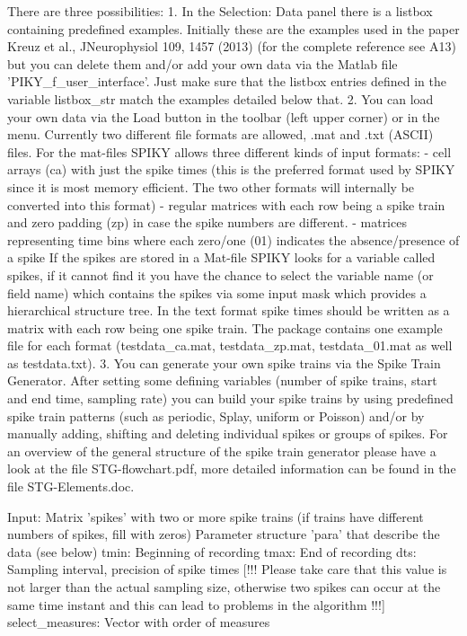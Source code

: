 \documentclass[10pt,twocolumn]{elsart5p}
\begin{document}
There are three possibilities:
1.	In the Selection: Data panel there is a listbox containing predefined examples. Initially these are the examples used in the paper Kreuz et al., JNeurophysiol 109, 1457 (2013) (for the complete reference see A13) but you can delete them and/or add your own data via the Matlab file 'PIKY\_f\_user\_interface'. Just make sure that the listbox entries defined in the variable listbox\_str match the examples detailed below that.
2.	You can load your own data via the Load button in the toolbar (left upper corner) or in the menu. Currently two different file formats are allowed, .mat and .txt (ASCII) files. For the mat-files SPIKY allows three different kinds of input formats:
- cell arrays (ca) with just the spike times (this is the preferred format used by SPIKY since it is most memory efficient. The two other formats will internally be converted into this format)
- regular matrices with each row being a spike train and zero padding (zp) in case the spike numbers are different.
- matrices representing time bins where each zero/one (01) indicates the absence/presence of a spike
If the spikes are stored in a Mat-file SPIKY looks for a variable called spikes, if it cannot find it you have the chance to select the variable name (or field name) which contains the spikes via some input mask which provides a hierarchical structure tree.
In the text format spike times should be written as a matrix with each row being one spike train. The package contains one example file for each format (testdata\_ca.mat, testdata\_zp.mat, testdata\_01.mat as well as testdata.txt). 
3.	You can generate your own spike trains via the Spike Train Generator. After setting some defining variables (number of spike trains, start and end time, sampling rate) you can build your spike trains by using predefined spike train patterns (such as periodic, Splay, uniform or Poisson) and/or by manually adding, shifting and deleting individual spikes or groups of spikes. For an overview of the general structure of the spike train generator please have a look at the file STG-flowchart.pdf, more detailed information can be found in the file STG-Elements.doc.


Input:
Matrix 'spikes' with two or more spike trains (if trains have different numbers of spikes, fill with zeros)
Parameter structure 'para' that describe the data (see below)
tmin:  Beginning of recording
tmax:  End of recording
dts:  Sampling interval, precision of spike times [!!! Please take care that this value is not larger than the actual sampling size, otherwise two spikes can occur at the same time instant and this can lead to problems in the algorithm !!!]
select\_measures: Vector with order of measures
\end{document}
